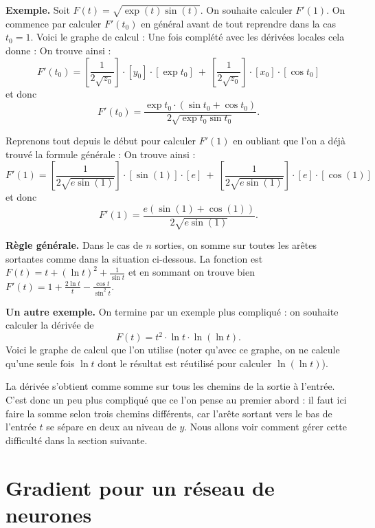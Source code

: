 \documentclass[11pt,class=report,crop=false]{standalone}
\begin{document}
\bigskip
\textbf{Exemple.}
Soit $F(t) = \sqrt{\exp(t)\sin(t)}$. On souhaite calculer $F'(1)$. On commence par calculer $F'(t_0)$ en général avant de tout reprendre dans la cas $t_0=1$.
Voici le graphe de calcul :
Une fois complété avec les dérivées locales cela donne :
On trouve ainsi :
$$F'(t_0) = \left[\frac{1}{2\sqrt{z_0}}\right]\cdot[y_0]\cdot[\exp t_0]
\  + \  \left[\frac{1}{2\sqrt{z_0}}\right]\cdot[x_0]\cdot[\cos t_0]
$$
et donc 
$$F'(t_0) = \frac{\exp t_0 \cdot (\sin t_0 + \cos t_0)}{2\sqrt{\exp t_0 \sin t_0}}.$$

Reprenons tout depuis le début pour calculer $F'(1)$ en oubliant que l'on a déjà trouvé la formule générale :
On trouve ainsi :
$$F'(1) = \left[\frac{1}{2\sqrt{e\sin(1)}}\right]\cdot[\sin(1)]\cdot[e]
\  + \  \left[\frac{1}{2\sqrt{e\sin(1)}}\right]\cdot[e]\cdot[\cos(1)]
$$
et donc 
$$F'(1) = \frac{e (\sin(1)+\cos(1))}{2\sqrt{e\sin(1)}}.$$


\bigskip
\textbf{Règle générale.}
Dans le cas de $n$ sorties, on somme sur toutes les arêtes sortantes comme dans la situation ci-dessous.
La fonction est $F(t) = t + (\ln t)^2 + \frac{1}{\sin t}$ et en sommant on trouve bien $F'(t) = 1 + \frac{2\ln t}{t} - \frac{\cos t}{\sin^2 t}$.


\bigskip
\textbf{Un autre exemple.}
On termine par un exemple plus compliqué : on souhaite calculer la dérivée de 
$$F(t) = t^2 \cdot \ln t \cdot \ln(\ln t).$$
Voici le graphe de calcul que l'on utilise (noter qu'avec ce graphe, on ne calcule qu'une seule fois $\ln t$ dont le résultat est réutilisé pour calculer $\ln(\ln t)$).


La dérivée s'obtient comme somme sur tous les chemins de la sortie à l'entrée.
C'est donc un peu plus compliqué que ce l'on pense au premier abord : il faut ici faire la somme selon trois chemins différents, car l'arête sortant vers le bas de l'entrée $t$ se sépare en deux au niveau de $y$. Nous allons voir comment gérer cette difficulté dans la section suivante.


\section{Gradient pour un réseau de neurones}
\end{document}
